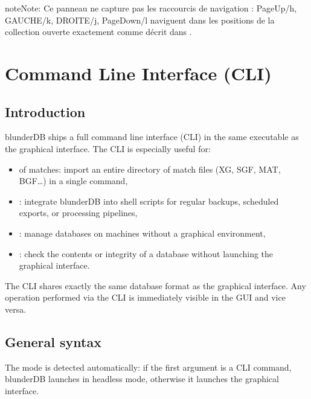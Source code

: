 \documentclass[letterpaper,10pt,english]{sphinxmanual}
\begin{document}
\begin{sphinxadmonition}{note}{Note:}
\sphinxAtStartPar
Ce panneau ne capture pas les raccourcis de navigation :
PageUp/h, GAUCHE/k, DROITE/j, PageDown/l naviguent dans les positions de
la collection ouverte exactement comme décrit dans
{\hyperref[\detokenize{raccourcis:raccourcis-navigation}]{}}.
\end{sphinxadmonition}

\sphinxstepscope


\section{Command Line Interface (CLI)}
\label{\detokenize{cli:interface-en-ligne-de-commande-cli}}\label{\detokenize{cli:cli}}\label{\detokenize{cli::doc}}

\subsection{Introduction}
\label{\detokenize{cli:introduction}}
\sphinxAtStartPar
blunderDB ships a full command line interface (CLI) in the same executable as the graphical interface. The CLI is especially useful for:
\begin{itemize}
\item {} 
\sphinxAtStartPar
{} of matches: import an entire directory of match files (XG, SGF, MAT, BGF…) in a single command,

\item {} 
\sphinxAtStartPar
{}: integrate blunderDB into shell scripts for regular backups, scheduled exports, or processing pipelines,

\item {} 
\sphinxAtStartPar
{}: manage databases on machines without a graphical environment,

\item {} 
\sphinxAtStartPar
{}: check the contents or integrity of a database without launching the graphical interface.

\end{itemize}

\sphinxAtStartPar
The CLI shares exactly the same database format as the graphical interface. Any operation performed via the CLI is immediately visible in the GUI and vice versa.


\subsection{General syntax}
\label{\detokenize{cli:syntaxe-generale}}
\sphinxAtStartPar
The mode is detected automatically: if the first argument is a CLI command, blunderDB launches in headless mode, otherwise it launches the graphical interface.
\end{document}
